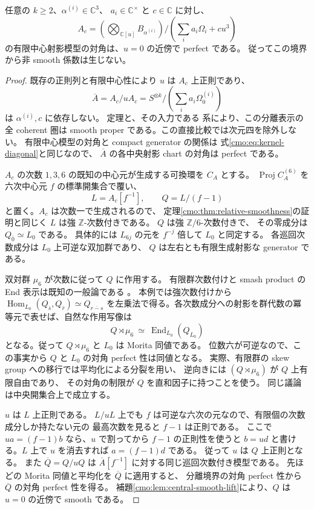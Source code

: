 \begin{proposition}[定数型混合族の全係数における射影境界]
\label{cmo:prop:projective-boundary-smooth}
任意の $k\ge2$、$\alpha^{(i)}\in\mathbb C^3$、
$a_i\in\mathbb C^\times$ と $c\in\mathbb C$ に対し、
\[
 A_c=\left(\bigotimes_{\mathbb C[u]}B_{\alpha^{(i)}}\right)
       \Big/\left(\sum_i a_i\Omega_i+cu^3\right)
\]
の有限中心射影模型の対角は、$u=0$ の近傍で perfect である。
従ってこの境界から非 smooth 係数は生じない。
\end{proposition}
\begin{proof}
既存の正則列と有限中心性により $u$ は $A_c$ 上正則であり、
\[
 \overline A=A_c/uA_c
   =S^{\otimes k}/\left(\sum_i a_i\Omega_0^{(i)}\right)
\]
は $\alpha^{(i)},c$ に依存しない。
定理と、その入力である
系により、この分離表示の全 coherent 圏は
smooth proper である。この直接比較では次元四を除外しない。
有限中心模型の対角と compact generator の関係は
式\eqref{cmo:eq:kernel-diagonal}と同じなので、
$\overline A$ の各中央射影 chart の対角は perfect である。

$A_c$ の次数 $1,3,6$ の既知の中心元が生成する可換環を $C_A$ とする。
$\operatorname{Proj}C_A^{(6)}$ を六次中心元 $f$ の標準開集合で覆い、
\[
 L=A_c[f^{-1}],\qquad Q=L/(f-1)
\]
と置く。$A_c$ は次数一で生成されるので、
定理\ref{cmo:thm:relative-smoothness}の証明と同じく $L$ は強 $\mathbb Z$-次数付きである。
$Q$ は強 $\mathbb Z/6$-次数付きで、
その零成分は $Q_{\bar0}\simeq L_0$ である。
具体的には $L_{6j}$ の元を $f^{-j}$ 倍して $L_0$ と同定する。
各巡回次数成分は $L_0$ 上可逆な双加群であり、
$Q$ は左右とも有限生成射影な generator である。

双対群 $\mu_6$ が次数に従って $Q$ に作用する。
有限群次数付けと smash product の End 表示は既知の一般論である
\cite[Theorems~1.3, 2.1]{CMONastasescuRodino}。
本例では強次数付けから
$\operatorname{Hom}_{L_0}(Q_{\bar s},Q_{\bar r})\simeq Q_{\overline{r-s}}$
を左乗法で得る。各次数成分への射影を群代数の冪等元で表せば、自然な作用写像は
\[
 Q\rtimes\mu_6\ \simeq\ \operatorname{End}_{L_0}(Q_{L_0})
\]
となる。従って $Q\rtimes\mu_6$ と $L_0$ は Morita 同値である。
位数六が可逆なので、この事実から
$Q$ と $L_0$ の対角 perfect 性は同値となる。
実際、有限群の skew group への移行では平均化による分裂を用い、
逆向きには $(Q\rtimes\mu_6)$ が $Q$ 上有限自由であり、
その対角の制限が $Q$ を直和因子に持つことを使う。
同じ議論は中央開集合上で成立する。

$u$ は $L$ 上正則である。
$L/uL$ 上でも $f$ は可逆な六次の元なので、有限個の次数成分しか持たない元の
最高次数を見ると $f-1$ は正則である。
ここで $ua=(f-1)b$ なら、$u$ で割ってから $f-1$ の正則性を使うと
$b=ud$ と書ける。$L$ 上で $u$ を消去すれば $a=(f-1)d$ である。
従って $u$ は $Q$ 上正則となる。
また $\overline Q=Q/uQ$ は $\overline A[f^{-1}]$ に対する同じ巡回次数付き模型である。
先ほどの Morita 同値と平均化を $\overline Q$ に適用すると、
分離境界の対角 perfect 性から $\overline Q$ の対角 perfect 性を得る。
補題\ref{cmo:lem:central-smooth-lift}により、$Q$ は $u=0$ の近傍で smooth である。


\end{proof}
